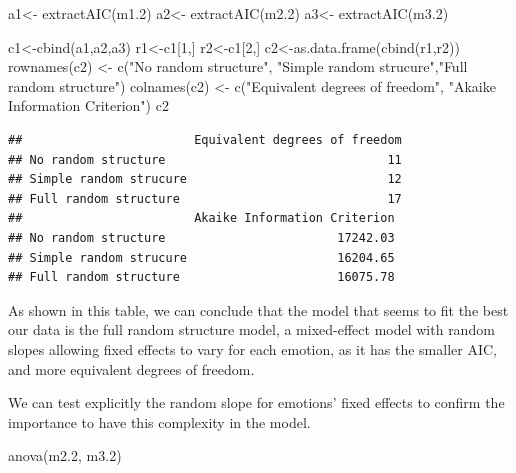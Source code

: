 \documentclass[
]{article}
\newenvironment{Shaded}{\begin{snugshade}}{\end{snugshade}}
\newcommand{\DecValTok}[1]{\textcolor[rgb]{0.00,0.00,0.81}{#1}}
\newcommand{\FloatTok}[1]{\textcolor[rgb]{0.00,0.00,0.81}{#1}}
\newcommand{\FunctionTok}[1]{\textcolor[rgb]{0.00,0.00,0.00}{#1}}
\newcommand{\NormalTok}[1]{#1}
\newcommand{\OtherTok}[1]{\textcolor[rgb]{0.56,0.35,0.01}{#1}}
\newcommand{\StringTok}[1]{\textcolor[rgb]{0.31,0.60,0.02}{#1}}
\begin{document}
\begin{Shaded}
\begin{Highlighting}[]
\NormalTok{a1}\OtherTok{\textless{}{-}} \FunctionTok{extractAIC}\NormalTok{(m1}\FloatTok{.2}\NormalTok{)}
\NormalTok{a2}\OtherTok{\textless{}{-}} \FunctionTok{extractAIC}\NormalTok{(m2}\FloatTok{.2}\NormalTok{)}
\NormalTok{a3}\OtherTok{\textless{}{-}} \FunctionTok{extractAIC}\NormalTok{(m3}\FloatTok{.2}\NormalTok{)}

\NormalTok{c1}\OtherTok{\textless{}{-}}\FunctionTok{cbind}\NormalTok{(a1,a2,a3)}
\NormalTok{r1}\OtherTok{\textless{}{-}}\NormalTok{c1[}\DecValTok{1}\NormalTok{,]}
\NormalTok{r2}\OtherTok{\textless{}{-}}\NormalTok{c1[}\DecValTok{2}\NormalTok{,]}
\NormalTok{c2}\OtherTok{\textless{}{-}}\FunctionTok{as.data.frame}\NormalTok{(}\FunctionTok{cbind}\NormalTok{(r1,r2))}
\FunctionTok{rownames}\NormalTok{(c2) }\OtherTok{\textless{}{-}} \FunctionTok{c}\NormalTok{(}\StringTok{"No random structure"}\NormalTok{, }\StringTok{"Simple random strucure"}\NormalTok{,}\StringTok{"Full random structure"}\NormalTok{)}
\FunctionTok{colnames}\NormalTok{(c2) }\OtherTok{\textless{}{-}} \FunctionTok{c}\NormalTok{(}\StringTok{"Equivalent degrees of freedom"}\NormalTok{, }\StringTok{"Akaike Information Criterion"}\NormalTok{)}
\NormalTok{c2}
\end{Highlighting}
\end{Shaded}

\begin{verbatim}
##                        Equivalent degrees of freedom
## No random structure                               11
## Simple random strucure                            12
## Full random structure                             17
##                        Akaike Information Criterion
## No random structure                        17242.03
## Simple random strucure                     16204.65
## Full random structure                      16075.78
\end{verbatim}

As shown in this table, we can conclude that the model that seems to fit
the best our data is the full random structure model, a mixed-effect
model with random slopes allowing fixed effects to vary for each
emotion, as it has the smaller AIC, and more equivalent degrees of
freedom.

We can test explicitly the random slope for emotions' fixed effects to
confirm the importance to have this complexity in the model.

\begin{Shaded}
\begin{Highlighting}[]
\FunctionTok{anova}\NormalTok{(m2}\FloatTok{.2}\NormalTok{, m3}\FloatTok{.2}\NormalTok{)}
\end{Highlighting}
\end{Shaded}
\end{document}
